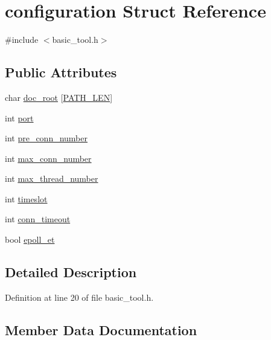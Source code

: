 \hypertarget{structconfiguration}{}\section{configuration Struct Reference}
\label{structconfiguration}


{\ttfamily \#include $<$basic\+\_\+tool.\+h$>$}

\subsection*{Public Attributes}
\begin{DoxyCompactItemize}
\item 
char \hyperlink{structconfiguration_a482e552476305ad16d1d517f4d87e3af}{doc\+\_\+root} \mbox{[}\hyperlink{basic__tool_8h_aac8fbc596a0261f72b1c34bec8fc40a6}{P\+A\+T\+H\+\_\+\+L\+EN}\mbox{]}
\item 
int \hyperlink{structconfiguration_a3f66b5ac4a31c99fca0743748e14efd9}{port}
\item 
int \hyperlink{structconfiguration_ab226ae89d4a24a48c4dacad3fbbd36c7}{pre\+\_\+conn\+\_\+number}
\item 
int \hyperlink{structconfiguration_ae9218aebfb7459d0bb8f400496d222ee}{max\+\_\+conn\+\_\+number}
\item 
int \hyperlink{structconfiguration_a5188009afa1e40fbbcb15d475da4b3e6}{max\+\_\+thread\+\_\+number}
\item 
int \hyperlink{structconfiguration_ad8f17212159a29d8ee87f3c9b8a4d0e3}{timeslot}
\item 
int \hyperlink{structconfiguration_aaf7e0fb1ff9ba2922fae1a2b4a3f3c02}{conn\+\_\+timeout}
\item 
bool \hyperlink{structconfiguration_a95c4d9c8e2e28f0418b2848a050c1e62}{epoll\+\_\+et}
\end{DoxyCompactItemize}


\subsection{Detailed Description}


Definition at line 20 of file basic\+\_\+tool.\+h.



\subsection{Member Data Documentation}
\mbox{\label{structconfiguration_aaf7e0fb1ff9ba2922fae1a2b4a3f3c02}} 
